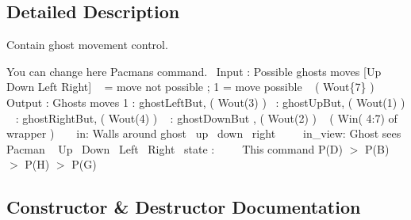 \subsection{Detailed Description}
Contain ghost movement control. 

You can change here Pacman\textquotesingle{}s command.~\newline
 Input \+: Possible ghost\textquotesingle{}s moves \mbox{[}Up Down Left Right\mbox{]} ~ = move not possible ; 1 = move possible ~\newline
 ( Wout\{7\} ) ~\newline
~\newline
 Output \+: Ghost\textquotesingle{}s moves 1 \+: ghost\+Left\+But, ( Wout(3) )~ \+: ghost\+Up\+But, ( Wout(1) ) ~ \+: ghost\+Right\+But, ( Wout(4) ) ~ \+: ghost\+Down\+But , ( Wout(2) ) ~\newline
 ( Win( 4\+:7) of wrapper ) ~\newline
~\newline
 in\+: Walls around ghost~ up~ down~ right~\newline
~\newline
~\newline
 in\+\_\+view\+: Ghost sees Pacman ~ Up~ Down~ Left~ Right~\newline
 state \+:~\newline
~\newline
~\newline
 This command P(\+D) $>$ P(\+B) $>$ P(\+H) $>$ P(\+G)~\newline
 

\subsection{Constructor \& Destructor Documentation}
\mbox{\label{class_model_ghost_a0eb9a8f9771bba8a091d35339af59343}} 
